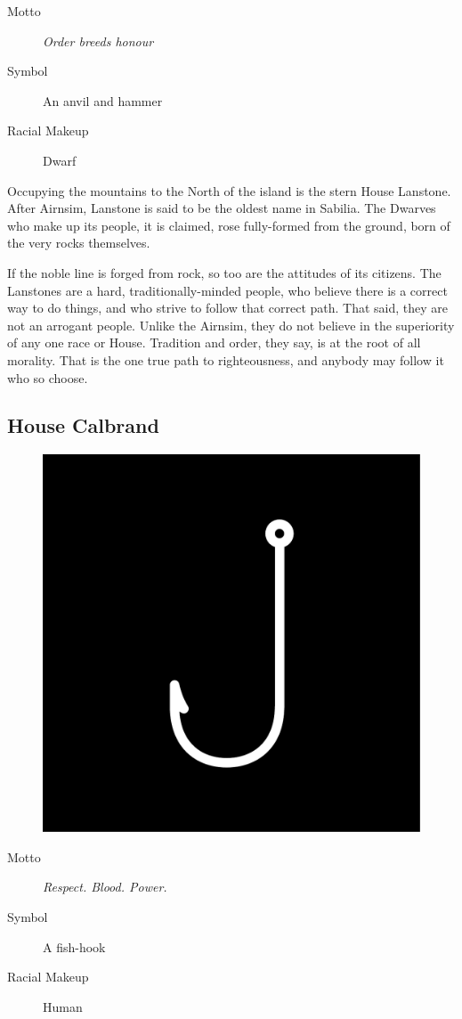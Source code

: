 \documentclass[10pt,twoside,openright,a4paper,twocolumn]{book}
\begin{document}
\begin{description}
\item[Motto] \textit{Order breeds honour}

\item[Symbol] An anvil and hammer

\item[Racial Makeup] Dwarf
\end{description}

\noindent
Occupying the mountains to the North of the island is the stern House Lanstone.
After Airnsim, Lanstone is said to be the oldest name in Sabilia.  The Dwarves
who make up its people, it is claimed, rose fully-formed from the ground, born
of the very rocks themselves.

If the noble line is forged from rock, so too are the attitudes of its citizens.
The Lanstones are a hard, traditionally-minded people, who believe there is a
correct way to do things, and who strive to follow that correct path.  That
said, they are not an arrogant people. Unlike the Airnsim, they do not believe
in the superiority of any one race or House.  Tradition and order, they say, is
at the root of all morality.  That is the one true path to righteousness, and
anybody may follow it who so choose.

\subsection*{House Calbrand}

\begin{figure}
  \includegraphics[width=0.48\columnwidth]{images/HouseCalbrand}
\end{figure}

\begin{description}
\item[Motto] \textit{Respect. Blood. Power.}

\item[Symbol] A fish-hook

\item[Racial Makeup] Human
\end{description}
\end{document}
